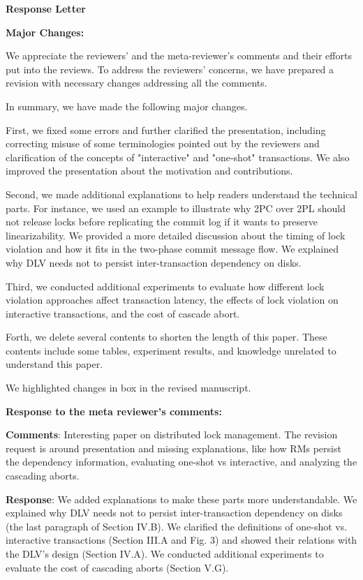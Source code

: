 \documentclass[conference]{IEEEtran}
\begin{document}
\begin{frame}{\relax}%

  \textbf{Response Letter}  


 \textbf{Major Changes:} 

  We appreciate the reviewers' and the meta-reviewer's comments and their efforts put into the reviews. To address the reviewers' concerns, we have prepared a revision with necessary changes addressing all the comments. 
  
  In summary, we have made the following major changes.
  
  First, we fixed some errors and further clarified the presentation, including correcting misuse of some terminologies pointed out by the reviewers and clarification of the concepts of "interactive" and "one-shot" transactions. We also improved the presentation about the motivation and contributions.
  
  Second, we made additional explanations to help readers understand the technical parts. For instance, we used an example to illustrate why 2PC over 2PL should not release locks before replicating the commit log if it wants to preserve linearizability. We provided a more detailed discussion about the timing of lock violation and how it fits in the two-phase commit message flow. We explained why DLV needs not to persist inter-transaction dependency on disks.
  
  Third, we conducted additional experiments to evaluate how different lock violation approaches affect transaction latency, the effects of lock violation on interactive transactions, and the cost of cascade abort.
  
  Forth, we delete several contents to shorten the length of this paper. These contents include some tables, experiment results, and knowledge unrelated to understand this paper.
  
  \begin{highlighted}
    We highlighted changes  in
  box in the revised manuscript.
    \end{highlighted}

 \textbf{Response to the meta reviewer’s comments:}

  \textbf{Comments}: Interesting paper on distributed lock management. The revision request is around presentation and missing explanations, like how RMs persist the dependency information, evaluating one-shot vs interactive, and analyzing the cascading aborts.
  
  \textbf{Response}: We added explanations to make these parts more understandable. We explained why DLV needs not to persist inter-transaction dependency on disks (the last paragraph of Section IV.B). We clarified the definitions of one-shot vs. interactive transactions (Section III.A and Fig. 3) and showed their relations with the DLV's design (Section IV.A).  We conducted additional experiments to evaluate the cost of cascading aborts (Section V.G).
  


\end{frame}
\end{document}
